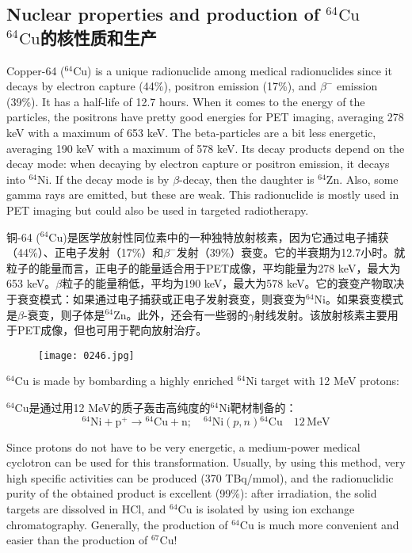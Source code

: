 \documentclass[dvipsnames, svgnames,a4paper,11pt]{article}
\begin{document}
\subsection{Nuclear properties and production of \(\mathrm{^{64}Cu}\)\\ \(\mathrm{^{64}Cu}\)的核性质和生产}  
Copper-64 (\(\mathrm{^{64}Cu}\)) is a unique radionuclide among medical radionuclides since it decays by electron capture (44\%), positron emission (17\%), and \(\beta^-\) emission (39\%). It has a half-life of 12.7 hours. When it comes to the energy of the particles, the positrons have pretty good energies for PET imaging, averaging 278 keV with a maximum of 653 keV. The beta-particles are a bit less energetic, averaging 190 keV with a maximum of 578 keV. Its decay products depend on the decay mode: when decaying by electron capture or positron emission, it decays into \(\mathrm{^{64}Ni}\). If the decay mode is by \(\beta\)-decay, then the daughter is \(\mathrm{^{64}Zn}\). Also, some gamma rays are emitted, but these are weak. This radionuclide is mostly used in PET imaging but could also be used in targeted radiotherapy.  

铜-64 (\(\mathrm{^{64}Cu}\))是医学放射性同位素中的一种独特放射核素，因为它通过电子捕获（44\%）、正电子发射（17\%）和\(\beta^-\)发射（39\%）衰变。它的半衰期为12.7小时。就粒子的能量而言，正电子的能量适合用于PET成像，平均能量为278 keV，最大为653 keV。\(\beta\)粒子的能量稍低，平均为190 keV，最大为578 keV。它的衰变产物取决于衰变模式：如果通过电子捕获或正电子发射衰变，则衰变为\(\mathrm{^{64}Ni}\)。如果衰变模式是\(\beta\)-衰变，则子体是\(\mathrm{^{64}Zn}\)。此外，还会有一些弱的$\gamma$射线发射。该放射核素主要用于PET成像，但也可用于靶向放射治疗。  

\begin{figure}[h]
	\centering
    \texttt{[image: 0246.jpg]}  
     \label{fig329}
\end{figure}


\(\mathrm{^{64}Cu}\) is made by bombarding a highly enriched \(\mathrm{^{64}Ni}\) target with 12 MeV protons:  

\(\mathrm{^{64}Cu}\)是通过用12 MeV的质子轰击高纯度的\(\mathrm{^{64}Ni}\)靶材制备的：  
\[
\mathrm{^{64}Ni} + \mathrm{p^+} \rightarrow \mathrm{^{64}Cu} + \mathrm{n}; \quad \mathrm{^{64}Ni}(p, n)\mathrm{^{64}Cu} \quad 12 \, \mathrm{MeV}
\]

Since protons do not have to be very energetic, a medium-power medical cyclotron can be used for this transformation. Usually, by using this method, very high specific activities can be produced (370 TBq/mmol), and the radionuclidic purity of the obtained product is excellent (99\%): after irradiation, the solid targets are dissolved in HCl, and \(\mathrm{^{64}Cu}\) is isolated by using ion exchange chromatography. Generally, the production of \(\mathrm{^{64}Cu}\) is much more convenient and easier than the production of \(\mathrm{^{67}Cu}\)!
\end{document}
